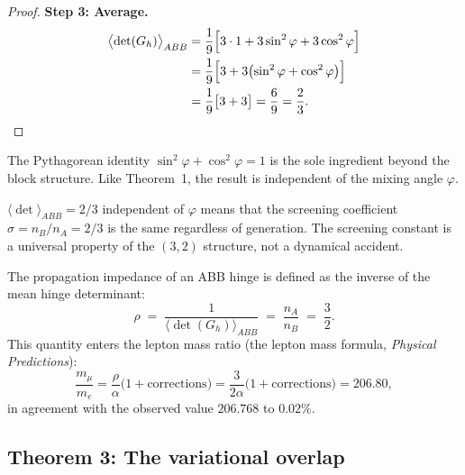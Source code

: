 \begin{proof}
\medskip\noindent\textbf{Step 3: Average.}
\begin{align}
\bigl\langle \det(G_h) \bigr\rangle_{ABB}
&= \frac{1}{9}\Bigl[3 \cdot 1 + 3\sin^2\varphi + 3\cos^2\varphi\Bigr]
\notag\\
&= \frac{1}{9}\Bigl[3 + 3\bigl(\sin^2\varphi + \cos^2\varphi\bigr)\Bigr]
\notag\\
&= \frac{1}{9}\bigl[3 + 3\bigr]
= \frac{6}{9} = \frac{2}{3}. \qedhere
\end{align}
\end{proof}

\begin{remark}[Universality]
The Pythagorean identity $\sin^2\varphi + \cos^2\varphi = 1$ is the
sole ingredient beyond the block structure.  Like Theorem~1, the
result is independent of the mixing angle $\varphi$.
\end{remark}

\begin{remark}
$\langle\det\rangle_{ABB} = 2/3$ independent of $\varphi$ means that the screening coefficient $\sigma = n_B/n_A = 2/3$ is the same regardless of generation.  The screening constant is a universal property of the $(3,2)$ structure, not a dynamical accident.
\end{remark}

\begin{corollary}\label{cor:impedance}
The propagation impedance of an ABB hinge is defined as the inverse of
the mean hinge determinant:
\begin{equation}
\rho \;=\; \frac{1}{\langle\det(G_h)\rangle_{ABB}}
\;=\; \frac{n_A}{n_B} \;=\; \frac{3}{2}.
\end{equation}
This quantity enters the lepton mass ratio
(the lepton mass formula, \textit{Physical Predictions}):
\begin{equation}
\frac{m_\mu}{m_e} = \frac{\rho}{\alpha}
\bigl(1 + \text{corrections}\bigr)
= \frac{3}{2\alpha}
\bigl(1 + \text{corrections}\bigr)
= 206.80,
\end{equation}
in agreement with the observed value $206.768$ to $0.02\%$.
\end{corollary}

\subsection{Theorem 3: The variational overlap}
\label{sec:thm_overlap}

